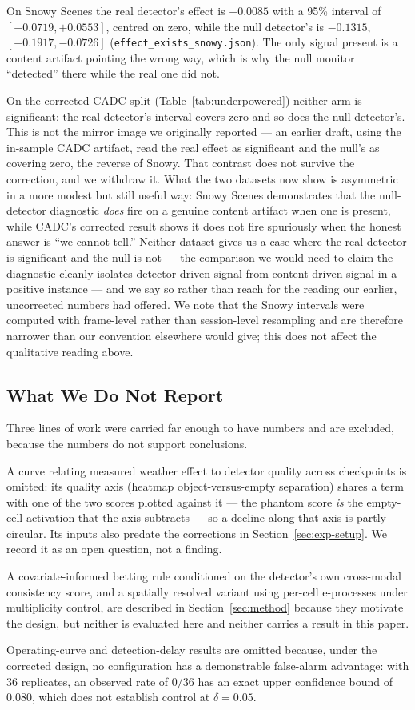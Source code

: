 On Snowy Scenes the real detector's effect is $-0.0085$ with a 95\%
interval of $[-0.0719, +0.0553]$, centred on zero, while the null
detector's is $-0.1315$, $[-0.1917, -0.0726]$
(\texttt{effect\_exists\_snowy.json}). The only signal present is a content
artifact pointing the wrong way, which is why the null monitor ``detected''
there while the real one did not.

On the corrected CADC split (Table~\ref{tab:underpowered}) neither arm is
significant: the real detector's interval covers zero and so does the null
detector's. This is not the mirror image we originally reported --- an
earlier draft, using the in-sample CADC artifact, read the real effect as
significant and the null's as covering zero, the reverse of Snowy. That
contrast does not survive the correction, and we withdraw it. What the two
datasets now show is asymmetric in a more modest but still useful way:
Snowy Scenes demonstrates that the null-detector diagnostic \emph{does}
fire on a genuine content artifact when one is present, while CADC's
corrected result shows it does not fire spuriously when the honest
answer is ``we cannot tell.'' Neither dataset gives us a case where the
real detector is significant and the null is not --- the comparison we
would need to claim the diagnostic cleanly isolates detector-driven signal
from content-driven signal in a positive instance --- and we say so rather
than reach for the reading our earlier, uncorrected numbers had offered. We
note that the Snowy intervals were computed with frame-level rather than
session-level resampling and are therefore narrower than our convention
elsewhere would give; this does not affect the qualitative reading above.

\subsection{What We Do Not Report}
\label{sec:not-reported}

Three lines of work were carried far enough to have numbers and are
excluded, because the numbers do not support conclusions.

A curve relating measured weather effect to detector quality across
checkpoints is omitted: its quality axis (heatmap object-versus-empty
separation) shares a term with one of the two scores plotted against it ---
the phantom score \emph{is} the empty-cell activation that the axis
subtracts --- so a decline along that axis is partly circular. Its inputs
also predate the corrections in Section~\ref{sec:exp-setup}. We record it
as an open question, not a finding.

A covariate-informed betting rule conditioned on the detector's own
cross-modal consistency score, and a spatially resolved variant using
per-cell e-processes under multiplicity control, are described in
Section~\ref{sec:method} because they motivate the design, but neither is
evaluated here and neither carries a result in this paper.

Operating-curve and detection-delay results are omitted because, under the
corrected design, no configuration has a demonstrable false-alarm
advantage: with 36 replicates, an observed rate of $0/36$ has an exact
upper confidence bound of $0.080$, which does not establish control at
$\delta = 0.05$.

